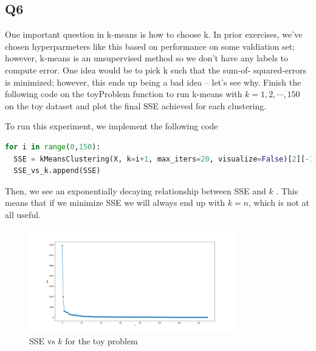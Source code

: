 \documentclass{article}
\theoremstyle{definition}
\begin{document}
    \subsection*{Q6}
        \begin{mdframed}
            One important question in k-means is how to choose k. In prior 
            exercises, we’ve chosen hyperparmeters like this based on 
            performance on some valdiation set; however, k-means is an 
            unsupervised method so we don’t have any labels to compute 
            error. One idea would be to pick k such that the sum-of-
            squared-errors is minimized; however, this ends up being a bad 
            idea – let’s see why. Finish the following code on the 
            toyProblem function to run k-means with $k = 1,2,\cdots,150$ 
            on the toy dataset and plot the final SSE achieved for each 
            clustering.
        \end{mdframed}
        To run this experiment, we implement the following code
        \begin{lstlisting}[language=python]
for i in range(0,150):
  SSE = kMeansClustering(X, k=i+1, max_iters=20, visualize=False)[2][-1]
  SSE_vs_k.append(SSE)
        \end{lstlisting}
        Then, we see an exponentially decaying relationship between SSE and 
        $k$ . This means that if we minimize SSE we will always end up with 
        $k = n$, which is not at all useful.
        \begin{figure}[htpb]
            \centering
            \includegraphics[width=0.8\textwidth]{figures/q6.png}
            \caption{SSE vs $k$ for the toy problem}
            \label{fig:}
        \end{figure}
\end{document}
